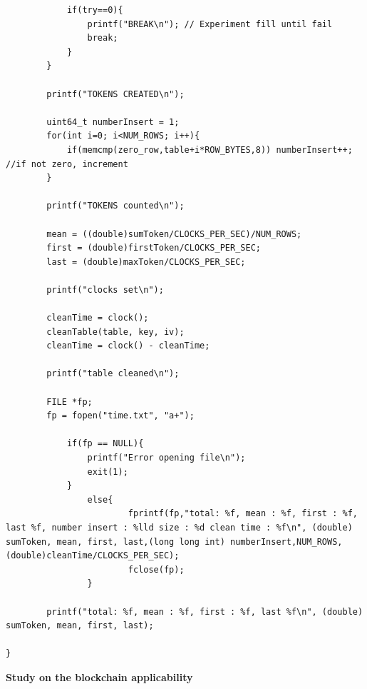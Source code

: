 \documentclass{llncs}
\begin{document}
\begin{lstlisting}
            if(try==0){
                printf("BREAK\n"); // Experiment fill until fail
                break;
            }
        }

        printf("TOKENS CREATED\n");

        uint64_t numberInsert = 1;
        for(int i=0; i<NUM_ROWS; i++){
            if(memcmp(zero_row,table+i*ROW_BYTES,8)) numberInsert++; //if not zero, increment
        }

        printf("TOKENS counted\n");

        mean = ((double)sumToken/CLOCKS_PER_SEC)/NUM_ROWS;
        first = (double)firstToken/CLOCKS_PER_SEC;
        last = (double)maxToken/CLOCKS_PER_SEC;

        printf("clocks set\n");

        cleanTime = clock();
        cleanTable(table, key, iv);
        cleanTime = clock() - cleanTime;

        printf("table cleaned\n");

        FILE *fp;
        fp = fopen("time.txt", "a+");

            if(fp == NULL){
                printf("Error opening file\n");
                exit(1);
            }
                else{
                        fprintf(fp,"total: %f, mean : %f, first : %f, last %f, number insert : %lld size : %d clean time : %f\n", (double) sumToken, mean, first, last,(long long int) numberInsert,NUM_ROWS, (double)cleanTime/CLOCKS_PER_SEC);
                        fclose(fp);
                }

        printf("total: %f, mean : %f, first : %f, last %f\n", (double) sumToken, mean, first, last);

}
\end{lstlisting}

\textbf{Study on the blockchain applicability}
\end{document}
